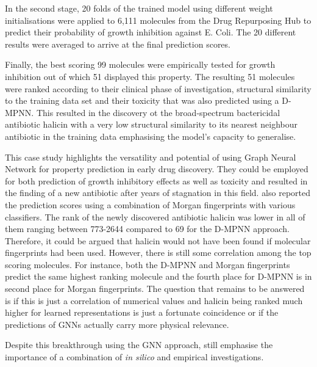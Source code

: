 In the second stage, 20 folds of the trained model using different weight initialisations were applied to 6,111 molecules from the Drug Repurposing Hub \citep{corsello} to predict their probability of growth inhibition against E. Coli. The 20 different results were averaged to arrive at the final prediction scores. 

Finally, the best scoring 99 molecules were empirically tested for growth inhibition out of which 51 displayed this property. The resulting 51 molecules were ranked according to their clinical phase of investigation, structural similarity to the training data set and their toxicity that was also predicted using a D-MPNN. This resulted in the discovery ot the broad-spectrum bactericidal antibiotic halicin with a very low structural similarity to its nearest neighbour antibiotic in the training data emphasising the model's capacity to generalise. 

This case study highlights the versatility and potential of using Graph Neural Network for property prediction in early drug discovery. They could be employed for both prediction of growth inhibitory effects as well as toxicity and resulted in the finding of a new antibiotic after years of stagnation in this field. \cite{STOKES2020688} also reported the prediction scores using a combination of Morgan fingerprints with various classifiers. The rank of the newly discovered antibiotic halicin was lower in all of them ranging between 773-2644 compared to 69 for the D-MPNN approach. Therefore, it could be argued that halicin would not have been found if molecular fingerprints had been used. However, there is still some correlation among the top scoring molecules. For instance, both the D-MPNN and Morgan fingerprints predict the same highest ranking molecule and the fourth place for D-MPNN is in second place for Morgan fingerprints. The question that remains to be answered is if this is just a correlation of numerical values and halicin being ranked much higher for learned representations is just a fortunate coincidence or if the predictions of GNNs actually carry more physical relevance.

Despite this breakthrough using the GNN approach, \cite{STOKES2020688} still emphasise the importance of a combination of \emph{in silico} and empirical investigations. 

